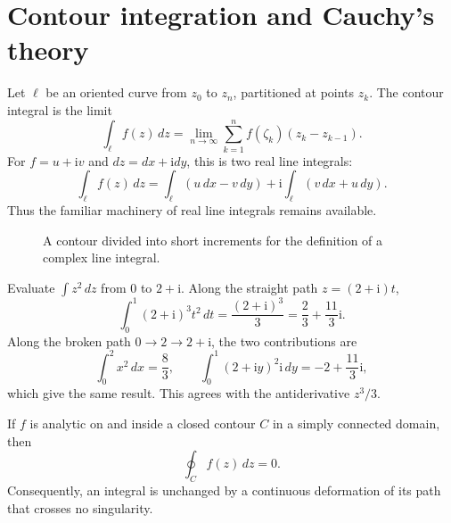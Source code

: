 \section{Contour integration and Cauchy's theory}

Let $\ell$ be an oriented curve from $z_0$ to $z_n$, partitioned at points $z_k$. The contour integral is the limit
\begin{equation}
\int_\ell f(z)\,dz=\lim_{n\to\infty}\sum_{k=1}^n f(\zeta_k)(z_k-z_{k-1}).
\end{equation}
For $f=u+\mathrm{i}v$ and $dz=dx+\mathrm{i}dy$, this is two real line integrals:
\begin{equation}
\int_\ell f(z)\,dz=\int_\ell(u\,dx-v\,dy)+\mathrm{i}\int_\ell(v\,dx+u\,dy).
\end{equation}
Thus the familiar machinery of real line integrals remains available.

\begin{figure}[htb]
    \centering
    \caption{A contour divided into short increments for the definition of a complex line integral.}
    \label{fig:ch06-contour-integral}
\end{figure}

\begin{example}
Evaluate $\int z^2\,dz$ from $0$ to $2+\mathrm{i}$. Along the straight path $z=(2+\mathrm{i})t$,
\begin{equation}
\int_0^1(2+\mathrm{i})^3t^2\,dt=\frac{(2+\mathrm{i})^3}{3}
=\frac23+\frac{11}{3}\mathrm{i}.
\end{equation}
Along the broken path $0\to2\to2+\mathrm{i}$, the two contributions are
\begin{equation}
\int_0^2x^2\,dx=\frac83,
\qquad
\int_0^1(2+\mathrm{i}y)^2\mathrm{i}\,dy=-2+\frac{11}{3}\mathrm{i},
\end{equation}
which give the same result. This agrees with the antiderivative $z^3/3$.
\end{example}

\begin{theorem}
If $f$ is analytic on and inside a closed contour $C$ in a simply connected domain, then
\begin{equation}
\oint_C f(z)\,dz=0.
\end{equation}
Consequently, an integral is unchanged by a continuous deformation of its path that crosses no singularity.
\end{theorem}

